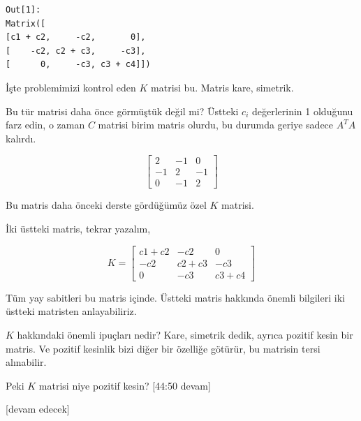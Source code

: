 \documentclass[12pt,fleqn]{article}\usepackage{../../common}
\begin{document}
\begin{verbatim}
Out[1]: 
Matrix([
[c1 + c2,     -c2,       0],
[    -c2, c2 + c3,     -c3],
[      0,     -c3, c3 + c4]])
\end{verbatim}

İşte problemimizi kontrol eden $K$ matrisi bu. Matris kare, simetrik.

Bu tür matrisi daha önce görmüştük değil mi? Üstteki $c_i$ değerlerinin 1
olduğunu farz edin, o zaman $C$ matrisi birim matris olurdu, bu durumda
geriye sadece $A^T A$ kalırdı.

$$
\left[\begin{array}{rrr}
2 & -1 & 0 \\ -1 & 2 & -1 \\ 0 & -1 & 2
\end{array}\right]
$$

Bu matris daha önceki derste gördüğümüz özel $K$ matrisi. 

İki üstteki matris, tekrar yazalım,

$$ K = 
\left[\begin{array}{rrr}
c1 + c2   &     -c2 &       0 \\
-c2       & c2 + c3 &     -c3 \\
0         & -c3     &      c3 + c4
\end{array}\right]
$$

Tüm yay sabitleri bu matris içinde. Üstteki matris hakkında önemli bilgileri
iki üstteki matristen anlayabiliriz. 

$K$ hakkındaki önemli ipuçları nedir? Kare, simetrik dedik, ayrıca pozitif kesin
bir matris. Ve pozitif kesinlik bizi diğer bir özelliğe götürür, bu matrisin
tersi alınabilir.

Peki $K$ matrisi niye pozitif kesin?  [44:50 devam]























[devam edecek]
\end{document}
